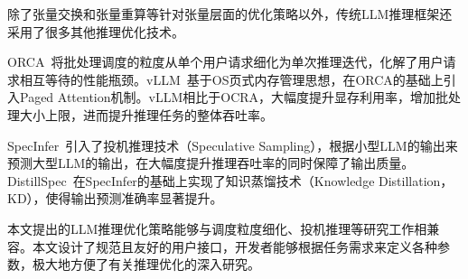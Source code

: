 除了张量交换和张量重算等针对张量层面的优化策略以外，传统LLM推理框架还采用了很多其他推理优化技术。

ORCA~\cite{ORCA}将批处理调度的粒度从单个用户请求细化为单次推理迭代，化解了用户请求相互等待的性能瓶颈。vLLM~\cite{vLLM}基于OS页式内存管理思想，在ORCA的基础上引入Paged Attention机制。vLLM相比于OCRA，大幅度提升显存利用率，增加批处理大小上限，进而提升推理任务的整体吞吐率。

SpecInfer~\cite{SpecInfer}引入了投机推理技术（Speculative Sampling），根据小型LLM的输出来预测大型LLM的输出，在大幅度提升推理吞吐率的同时保障了输出质量。DistillSpec~\cite{DistillSpec}在SpecInfer的基础上实现了知识蒸馏技术（Knowledge Distillation，KD），使得输出预测准确率显著提升。

本文提出的LLM推理优化策略能够与调度粒度细化、投机推理等研究工作相兼容。本文设计了规范且友好的用户接口，开发者能够根据任务需求来定义各种参数，极大地方便了有关推理优化的深入研究。


  

  

  

